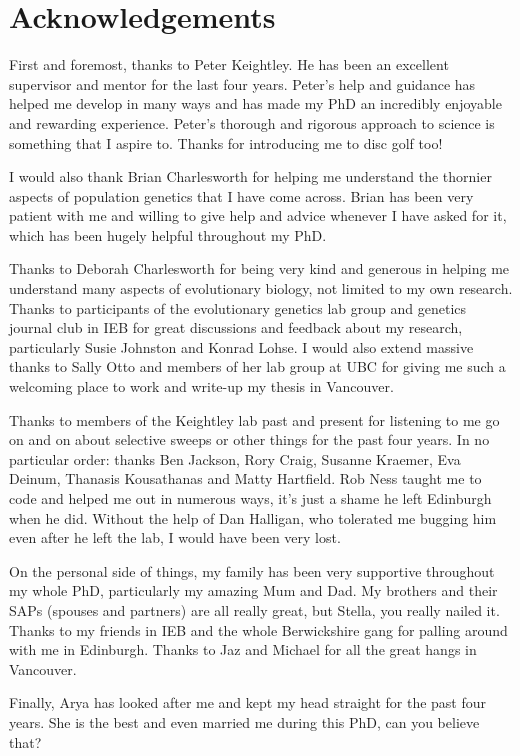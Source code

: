 \chapter{Acknowledgements}

First and foremost, thanks to Peter Keightley. He has been an excellent supervisor and mentor for the last four years. Peter's help and guidance has helped me develop in many ways and has made my PhD an incredibly enjoyable and rewarding experience. Peter's thorough and rigorous approach to science is something that I aspire to. Thanks for introducing me to disc golf too!

I would also thank Brian Charlesworth for helping me understand the thornier aspects of population genetics that I have come across. Brian has been very patient with me and willing to give help and advice whenever I have asked for it, which has been hugely helpful throughout my PhD.

Thanks to Deborah Charlesworth for being very kind and generous in helping me understand many aspects of evolutionary biology, not limited to my own research. Thanks to participants of the evolutionary genetics lab group and genetics journal club in IEB for great discussions and feedback about my research, particularly Susie Johnston and Konrad Lohse. I would also extend massive thanks to Sally Otto and members of her lab group at UBC for giving me such a welcoming place to work and write-up my thesis in Vancouver.

Thanks to members of the Keightley lab past and present for listening to me go on and on about selective sweeps or other things for the past four years. In no particular order: thanks Ben Jackson, Rory Craig, Susanne Kraemer, Eva Deinum, Thanasis Kousathanas and Matty Hartfield. Rob Ness taught me to code and helped me out in numerous ways, it's just a shame he left Edinburgh when he did. Without the help of Dan Halligan, who tolerated me bugging him even after he left the lab, I would have been very lost.

On the personal side of things, my family has been very supportive throughout my whole PhD, particularly my amazing Mum and Dad. My brothers and their SAPs (spouses and partners) are all really great, but Stella, you really nailed it. Thanks to my friends in IEB and the whole Berwickshire gang for palling around with me in Edinburgh. Thanks to Jaz and Michael for all the great hangs in Vancouver. 

Finally, Arya has looked after me and kept my head straight for the past four years. She is the best and even married me during this PhD, can you believe that?

